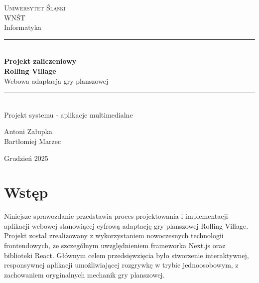 \documentclass[12pt, a4paper]{article}
\begin{document}
\begin{titlepage}
    \centering
    \vspace*{1cm}
    
    {\Large\textsc{Uniwersytet Śląski}}\\[0.3cm]
    {\large\textsc{WNŚT}}\\[0.3cm]
    {\large Informatyka}\\[2cm]
    
    \rule{\linewidth}{0.5mm}\\[0.4cm]
    {\Huge\bfseries Projekt zaliczeniowy\\[0.3cm]
    Rolling Village}\\[0.2cm]
    {\large Webowa adaptacja gry planszowej}\\[0.1cm]
    \rule{\linewidth}{0.5mm}\\[2cm]
    
    {\Large Projekt systemu - aplikacje multimedialne}\\[3cm]
    
    \begin{flushright}
        {\Large Antoni Załupka}\\[0.1cm]
        {\Large Bartłomiej Marzec}\\[0.1cm]
    \end{flushright}
    
    \vfill
    
    {\large Grudzień 2025}
\end{titlepage}

\newpage
\tableofcontents
\newpage

\section{Wstęp}

Niniejsze sprawozdanie przedstawia proces projektowania i implementacji aplikacji webowej stanowiącej cyfrową adaptację gry planszowej Rolling Village. Projekt został zrealizowany z wykorzystaniem nowoczesnych technologii frontendowych, ze szczególnym uwzględnieniem frameworka Next.js oraz biblioteki React. Głównym celem przedsięwzięcia było stworzenie interaktywnej, responsywnej aplikacji umożliwiającej rozgrywkę w trybie jednoosobowym, z zachowaniem oryginalnych mechanik gry planszowej.
\end{document}
